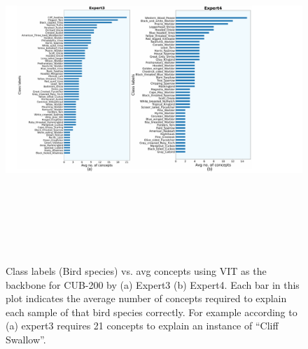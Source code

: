 \begin{figure}
\centering
\includegraphics[width=14cm, height=13cm]
{figures/Supp/Avg_concept_class_VIT_cub_2.pdf}
\caption{Class labels (Bird species) vs. avg concepts using VIT as the backbone for CUB-200 by (a) Expert3 (b) Expert4. Each bar in this plot indicates the average number of concepts required to explain each sample of that bird species correctly. For example according to (a) expert3 requires 21 concepts to explain an instance of ``Cliff Swallow''.}
\label{fig:vit_cub_concept_3_4}
\end{figure}


